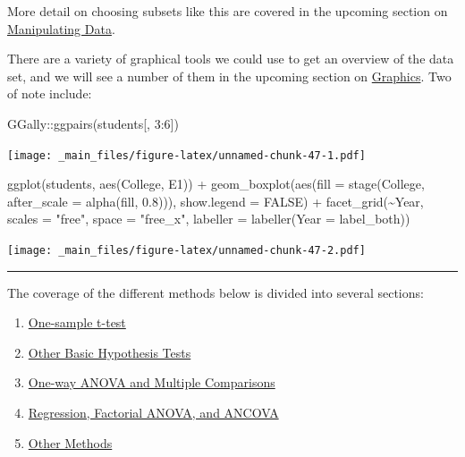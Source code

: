 \documentclass[
]{book}
\newenvironment{Shaded}{\begin{snugshade}}{\end{snugshade}}
\newcommand{\AttributeTok}[1]{\textcolor[rgb]{0.77,0.63,0.00}{#1}}
\newcommand{\ConstantTok}[1]{\textcolor[rgb]{0.00,0.00,0.00}{#1}}
\newcommand{\DecValTok}[1]{\textcolor[rgb]{0.00,0.00,0.81}{#1}}
\newcommand{\FloatTok}[1]{\textcolor[rgb]{0.00,0.00,0.81}{#1}}
\newcommand{\FunctionTok}[1]{\textcolor[rgb]{0.00,0.00,0.00}{#1}}
\newcommand{\NormalTok}[1]{#1}
\newcommand{\SpecialCharTok}[1]{\textcolor[rgb]{0.00,0.00,0.00}{#1}}
\newcommand{\StringTok}[1]{\textcolor[rgb]{0.31,0.60,0.02}{#1}}
\providecommand{\tightlist}{%
  \setlength{\itemsep}{0pt}\setlength{\parskip}{0pt}}
\begin{document}
More detail on choosing subsets like this are covered in the upcoming section on \protect\hyperlink{manipulating-data}{Manipulating Data}.

There are a variety of graphical tools we could use to get an overview of the data set, and we will see a number of them in the upcoming section on \protect\hyperlink{graphics}{Graphics}. Two of note include:

\begin{Shaded}
\begin{Highlighting}[]
\NormalTok{GGally}\SpecialCharTok{::}\FunctionTok{ggpairs}\NormalTok{(students[, }\DecValTok{3}\SpecialCharTok{:}\DecValTok{6}\NormalTok{])}
\end{Highlighting}
\end{Shaded}

\texttt{[image: \_main\_files/figure-latex/unnamed-chunk-47-1.pdf]}

\begin{Shaded}
\begin{Highlighting}[]
\FunctionTok{ggplot}\NormalTok{(students, }\FunctionTok{aes}\NormalTok{(College, E1)) }\SpecialCharTok{+}
  \FunctionTok{geom\_boxplot}\NormalTok{(}\FunctionTok{aes}\NormalTok{(}\AttributeTok{fill =} \FunctionTok{stage}\NormalTok{(College, }\AttributeTok{after\_scale =} \FunctionTok{alpha}\NormalTok{(fill, }\FloatTok{0.8}\NormalTok{))), }\AttributeTok{show.legend =} \ConstantTok{FALSE}\NormalTok{) }\SpecialCharTok{+}
  \FunctionTok{facet\_grid}\NormalTok{(}\SpecialCharTok{\textasciitilde{}}\NormalTok{Year, }\AttributeTok{scales =} \StringTok{"free"}\NormalTok{, }\AttributeTok{space =} \StringTok{"free\_x"}\NormalTok{, }\AttributeTok{labeller =} \FunctionTok{labeller}\NormalTok{(}\AttributeTok{Year =}\NormalTok{ label\_both))}
\end{Highlighting}
\end{Shaded}

\texttt{[image: \_main\_files/figure-latex/unnamed-chunk-47-2.pdf]}

\begin{center}\rule{0.5\linewidth}{0.5pt}\end{center}

The coverage of the different methods below is divided into several sections:

\begin{enumerate}
\def\labelenumi{\arabic{enumi}.}
\tightlist
\item
  \protect\hyperlink{one-sample-t-test}{One-sample t-test}
\item
  \protect\hyperlink{other-hypothesis-tests}{Other Basic Hypothesis Tests}
\item
  \protect\hyperlink{one-way-anova}{One-way ANOVA and Multiple Comparisons}
\item
  \protect\hyperlink{regression-ancova}{Regression, Factorial ANOVA, and ANCOVA}
\item
  \protect\hyperlink{other-methods}{Other Methods}
\end{enumerate}
\end{document}
